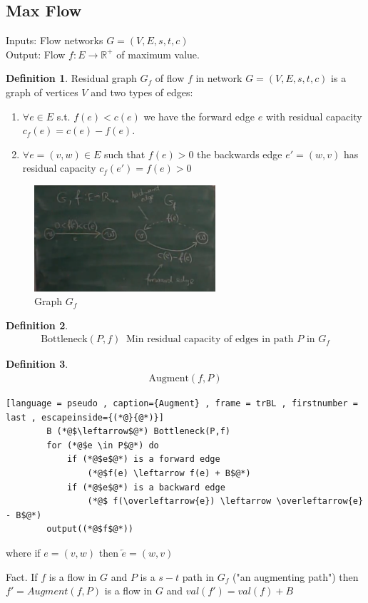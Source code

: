 \documentclass[a4paper]{article}
\theoremstyle{plain}
\newcommand*{\MyDef}{\mathrm{def}}
\newcommand*{\eqdef}{\ensuremath{\mathop{\overset{\MyDef}{=}}}}
\theoremstyle{definition}
\newtheorem{defn}{Definition}[section]
\theoremstyle{remark}
\begin{document}
	\subsection{Max Flow}
	Inputs: Flow networks $G=(V,E,s,t,c)$ \\
	Output: Flow $f : E \to \mathbb{R}^{+}$ of maximum value.\\
	\begin{defn}
		Residual graph $G_f$ of flow $f$ in network $G=(V,E,s,t,c)$ is a graph of vertices $V$ and two types of edges:
		\begin{enumerate}
			\item $\forall e \in E$ s.t. $f(e) < c(e)$ we have the forward edge $e $ with residual capacity $c_f(e) = c(e) - f(e)$. 
			\item $\forall  e = (v,w) \in E$ such that $f(e) > 0$ the backwards edge  $e'=(w,v)$ has residual capacity $c_f(e') = f(e) > 0$
		\end{enumerate}
		\begin{figure}[H]
			\centering
			\includegraphics[width=0.6\textwidth]{two.png}
			\caption{Graph $G_f$}
			\label{fig:two-png}
		\end{figure}
	\end{defn}
	\begin{defn}
		\begin{align*}
			\text{Bottleneck}(P,f) \eqdef \text{Min residual capacity of edges in path $P$ in $G_f$}
		\end{align*}
	\end{defn}
	\begin{defn}
		\begin{align*}
			\text{Augment}(f,P)
		\end{align*}
		\begin{lstlisting}[language = pseudo , caption={Augment} , frame = trBL , firstnumber = last , escapeinside={(*@}{@*)}]
		B (*@$\leftarrow$@*) Bottleneck(P,f)
		for (*@$e \in P$@*) do 
			if (*@$e$@*) is a forward edge
				(*@$f(e) \leftarrow f(e) + B$@*)
			if (*@$e$@*) is a backward edge
				(*@$ f(\overleftarrow{e}) \leftarrow \overleftarrow{e} - B$@*)
		output((*@$f$@*))
		\end{lstlisting}
		where if $e = (v,w)$ then $\overleftarrow{e} = (w,v)$
	\end{defn}
	Fact. If $f$ is a flow in $G$ and $P$ is a $s-t$ path in $G_f$ ("an augmenting path") then $f'=Augment(f,P)$ is a flow in $G$ and $val(f') = val(f) + B$ \\
\end{document}
